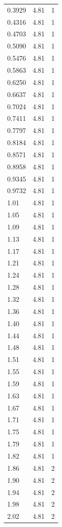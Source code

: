 \begin{longtable}{lrr}
  0.3929 & 4.81 & 1 \\
  0.4316 & 4.81 & 1 \\
  0.4703 & 4.81 & 1 \\
  0.5090 & 4.81 & 1 \\
  0.5476 & 4.81 & 1 \\
  0.5863 & 4.81 & 1 \\
  0.6250 & 4.81 & 1 \\
  0.6637 & 4.81 & 1 \\
  0.7024 & 4.81 & 1 \\
  0.7411 & 4.81 & 1 \\
  0.7797 & 4.81 & 1 \\
  0.8184 & 4.81 & 1 \\
  0.8571 & 4.81 & 1 \\
  0.8958 & 4.81 & 1 \\
  0.9345 & 4.81 & 1 \\
  0.9732 & 4.81 & 1 \\
  1.01 & 4.81 & 1 \\
  1.05 & 4.81 & 1 \\
  1.09 & 4.81 & 1 \\
  1.13 & 4.81 & 1 \\
  1.17 & 4.81 & 1 \\
  1.21 & 4.81 & 1 \\
  1.24 & 4.81 & 1 \\
  1.28 & 4.81 & 1 \\
  1.32 & 4.81 & 1 \\
  1.36 & 4.81 & 1 \\
  1.40 & 4.81 & 1 \\
  1.44 & 4.81 & 1 \\
  1.48 & 4.81 & 1 \\
  1.51 & 4.81 & 1 \\
  1.55 & 4.81 & 1 \\
  1.59 & 4.81 & 1 \\
  1.63 & 4.81 & 1 \\
  1.67 & 4.81 & 1 \\
  1.71 & 4.81 & 1 \\
  1.75 & 4.81 & 1 \\
  1.79 & 4.81 & 1 \\
  1.82 & 4.81 & 1 \\
  1.86 & 4.81 & 2 \\
  1.90 & 4.81 & 2 \\
  1.94 & 4.81 & 2 \\
  1.98 & 4.81 & 2 \\
  2.02 & 4.81 & 2 \\

\end{longtable}
